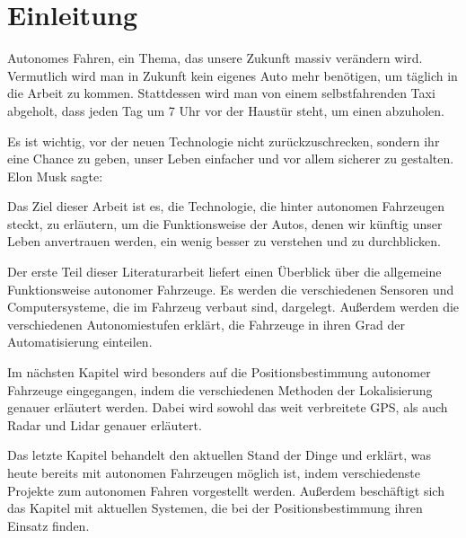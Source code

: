 \chapter{Einleitung}

Autonomes Fahren, ein Thema, das unsere Zukunft massiv verändern wird. Vermutlich wird man in Zukunft kein eigenes Auto mehr benötigen, um täglich in die Arbeit zu kommen. Stattdessen wird man von einem selbstfahrenden Taxi abgeholt, dass jeden Tag um 7 Uhr vor der Haustür steht, um einen abzuholen.

Es ist wichtig, vor der neuen Technologie nicht zurückzuschrecken, sondern ihr eine Chance zu geben, unser Leben einfacher und vor allem sicherer zu gestalten. Elon Musk sagte: 

\bigskip

Das Ziel dieser Arbeit ist es, die Technologie, die hinter autonomen Fahrzeugen steckt, zu erläutern, um die Funktionsweise der Autos, denen wir künftig unser Leben anvertrauen werden, ein wenig besser zu verstehen und zu durchblicken.

Der erste Teil dieser Literaturarbeit liefert einen Überblick über die allgemeine Funktionsweise autonomer Fahrzeuge. Es werden die verschiedenen Sensoren und Computersysteme, die im Fahrzeug verbaut sind, dargelegt. Außerdem werden die verschiedenen Autonomiestufen erklärt, die Fahrzeuge in ihren Grad der Automatisierung einteilen.

Im nächsten Kapitel wird besonders auf die Positionsbestimmung autonomer Fahrzeuge eingegangen, indem die verschiedenen Methoden der Lokalisierung genauer erläutert werden. Dabei wird sowohl das weit verbreitete \ac{GPS}, als auch \acs{Radar} und \acs{Lidar} genauer erläutert.

Das letzte Kapitel behandelt den aktuellen Stand der Dinge und erklärt, was heute bereits mit autonomen Fahrzeugen möglich ist, indem verschiedenste Projekte zum autonomen Fahren vorgestellt werden. Außerdem beschäftigt sich das Kapitel mit aktuellen Systemen, die bei der Positionsbestimmung ihren Einsatz finden.
